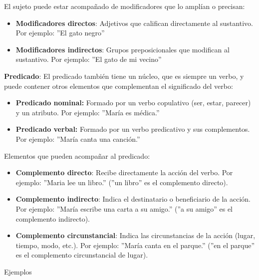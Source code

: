 El sujeto puede estar acompañado de modificadores que lo amplían o precisan:

\begin{itemize}
      \item \textbf{Modificadores directos}: Adjetivos que califican directamente al sustantivo. Por ejemplo: ''El gato negro''
      \item \textbf{Modificadores indirectos}: Grupos preposicionales que modifican al sustantivo. Por ejemplo: ''El gato de mi vecino''
\end{itemize}

\textbf{Predicado}: El predicado también tiene un núcleo, que es siempre un verbo, y puede contener otros elementos que complementan el significado del verbo:

\begin{itemize}
      \item \textbf{Predicado nominal:} Formado por un verbo copulativo (ser, estar, parecer) y un atributo. Por ejemplo: ''María es médica.''
      \item \textbf{Predicado verbal:} Formado por un verbo predicativo y sus complementos. Por ejemplo: ''María canta una canción.''
\end{itemize}

Elementos que pueden acompañar al predicado:
\begin{itemize}
      \item \textbf{Complemento directo}: Recibe directamente la acción del verbo. Por ejemplo: ''Maria lee un libro.'' (''un libro'' es el complemento directo).
      \item \textbf{Complemento indirecto}: Indica el destinatario o beneficiario de la acción. Por ejemplo: ''María escribe una carta a su amigo.'' (''a su amigo'' es el complemento indirecto).
      \item \textbf{Complemento circunstancial}: Indica las circunstancias de la acción (lugar, tiempo, modo, etc.). Por ejemplo: ''María canta en el parque.'' (''en el parque'' es el complemento circunstancial de lugar).
\end{itemize}

Ejemplos

